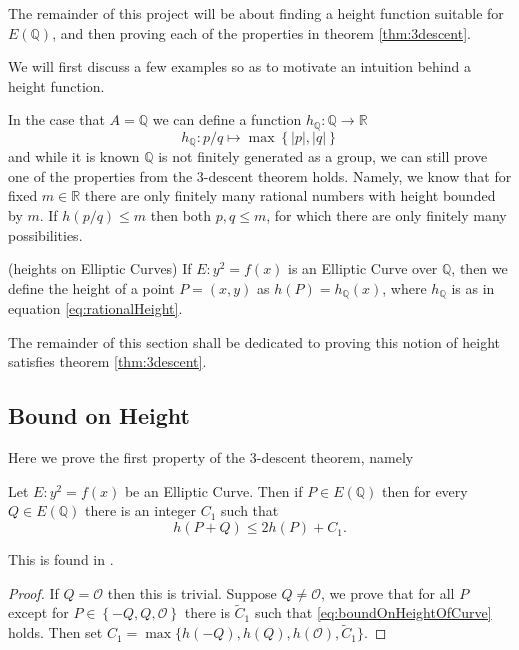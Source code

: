 The remainder of this project will be about finding a height function
suitable for $E(\mathbb{Q})$, and then proving each of the properties
in theorem \ref{thm:3descent}.

We will first discuss a few examples so as to motivate an intuition behind
a height function.
\begin{example}
  In the case that $A = \mathbb{Q}$ we can define a function
  $h_{\mathbb{Q}}: \mathbb{Q} \to \mathbb{R}$
  \begin{equation} \label{eq:rationalHeight}
    h_{\mathbb{Q}}: p/q \mapsto \max \left\{ |p|, |q| \right\}
  \end{equation}
  and while it is known $\mathbb{Q}$ is not finitely generated
  as a group, we can still prove one of the properties from the
  3-descent theorem holds.
  Namely, we know that for fixed $m \in \mathbb{R}$ there
  are only finitely many rational numbers with height bounded
  by $m$. If $h(p/q) \leq m$ then both $p, q \leq m$,
  for which there are only finitely many possibilities.
\end{example}
\begin{definition} \label{def:ellipticHeight}
  (heights on Elliptic Curves)
  If $E: y^2 = f(x)$ is an Elliptic Curve over $\mathbb{Q}$, then
  we define the height of a point $P = (x,y)$ as
  $h(P) = h_{\mathbb{Q}}(x)$, where $h_{\mathbb{Q}}$ is
  as in equation \ref{eq:rationalHeight}.
\end{definition}
The remainder of this section shall be dedicated to proving
this notion of height satisfies theorem \ref{thm:3descent}.

\subsection{Bound on Height}%
\label{sub:bound_on_height}
Here we prove the first property of the 3-descent theorem, namely
\begin{lemma}
  Let $E: y^2 = f(x)$ be an Elliptic Curve.
  Then if $P \in E(\mathbb{Q})$ then for
  every $Q \in E(\mathbb{Q})$ there
  is an integer $C_1$ such that
  \begin{equation} \label{eq:boundOnHeightOfCurve}
    h(P + Q) \leq 2 h(P) + C_1.
  \end{equation}
\end{lemma}
This is found in \cite[section 3.2]{silvermanRationalPoints}.
\begin{proof}
  If $Q = \mathcal{O}$ then this
  is trivial.
  Suppose $Q \neq \mathcal{O}$,
  we prove that for all $P$ except
  for $ P \in \left\{ -Q, Q, \mathcal{O} \right\}$ there is
  $\tilde{C}_1$ such that \ref{eq:boundOnHeightOfCurve} holds.
  Then set $C_1 = \max\{h(-Q), h(Q), h(\mathcal{O}), \tilde{C}_1\}$.
\end{proof}
